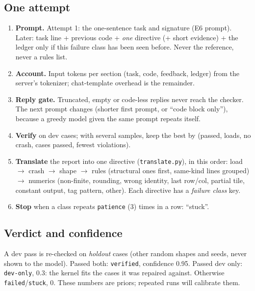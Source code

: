 \documentclass[11pt]{article}
\newcommand{\code}[1]{\texttt{#1}}
\begin{document}
\subsection{One attempt}
\begin{enumerate}
  \item \textbf{Prompt.} Attempt 1: the one-sentence task and signature (E6 prompt). Later:
        task line + previous code + \emph{one} directive (+ short evidence) + the ledger only if
        this failure class has been seen before. Never the reference, never a rules list.
  \item \textbf{Account.} Input tokens per section (task, code, feedback, ledger) from the
        server's tokenizer; chat-template overhead is the remainder.
  \item \textbf{Reply gate.} Truncated, empty or code-less replies never reach the checker. The
        next prompt changes (shorter first prompt, or ``code block only''), because a greedy
        model given the same prompt repeats itself.
  \item \textbf{Verify} on dev cases; with several samples, keep the best by
        (passed, loads, no crash, cases passed, fewest violations).
  \item \textbf{Translate} the report into one directive (\code{translate.py}), in this order:
        load $\to$ crash $\to$ shape $\to$ rules (structural ones first, same-kind lines grouped)
        $\to$ numerics (non-finite, rounding, wrong identity, last row/col, partial tile,
        constant output, tag pattern, other). Each directive has a \emph{failure class} key.
  \item \textbf{Stop} when a class repeats \code{patience} (3) times in a row: ``stuck''.
\end{enumerate}

\subsection{Verdict and confidence}
A dev pass is re-checked on \emph{holdout} cases (other random shapes and seeds, never shown to the
model). Passed both: \code{verified}, confidence 0.95. Passed dev only: \code{dev-only}, 0.3: the
kernel fits the cases it was repaired against. Otherwise \code{failed}/\code{stuck}, 0. These
numbers are priors; repeated runs will calibrate them.
\end{document}
